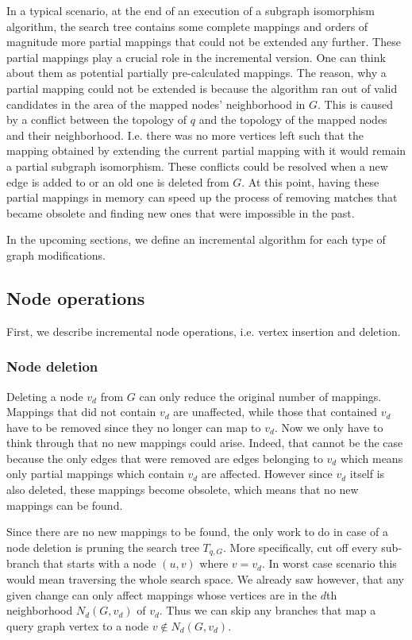 In a typical scenario, at the end of an execution of a subgraph isomorphism algorithm,
the search tree contains some complete mappings and orders of magnitude more partial 
mappings that could not be extended any further. These partial mappings play a crucial 
role in the incremental version. One can think about them as potential partially 
pre-calculated mappings. The reason, why a partial mapping could not be extended is 
because the algorithm ran out of valid candidates in the area of the mapped nodes' 
neighborhood in \(G\). This is caused by a conflict between the topology of \(q\) and 
the topology of the mapped nodes and their neighborhood. I.e. there was no more vertices 
left such that the mapping obtained by extending the current partial mapping with it would 
remain a partial subgraph isomorphism. These conflicts could be resolved when a new edge is 
added to or an old one is deleted from \(G\). At this point, having these partial mappings 
in memory can speed up the process of removing  matches that became obsolete and finding new 
ones that were impossible in the past.

In the upcoming sections, we define an incremental algorithm for each type of graph 
modifications.

\subsection{Node operations}

First, we describe incremental node operations, i.e. vertex insertion and deletion.

\subsubsection{Node deletion}

Deleting a node $v_d$ from $G$ can only reduce the original number of mappings.
Mappings that did not contain $v_d$ are unaffected, while those that contained $v_d$ 
have to be removed since they no longer can map to $v_d$. Now we only have to think 
through that no new mappings could arise. Indeed, that cannot be the case because
the only edges that were removed are edges belonging to $v_d$ which means only 
partial mappings which contain $v_d$ are affected. However since $v_d$ itself is also
deleted, these mappings become obsolete, which means that no new mappings can be
found.

Since there are no new mappings to be found, the only work to do in case of a node
deletion is pruning the search tree $T_{q, G}$. More specifically, cut off every
sub-branch that starts with a node $(u, v)$ where $v = v_d$. In worst case scenario
this would mean traversing the whole search space. We already saw however, that any
given change can only affect mappings whose vertices are in the $d$th neighborhood
$N_d(G, v_d)$ of $v_d$. Thus we can skip any branches that map a query graph vertex
to a node $v \notin N_d(G, v_d)$.

